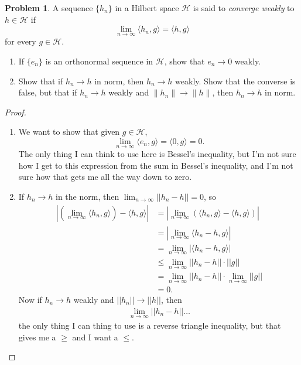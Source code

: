 \documentclass[12pt]{article}
\theoremstyle{definition}
\newtheorem{ex}{Problem}
\begin{document}
\begin{ex}
	A sequence $\lbrace h_n \rbrace$ in a Hilbert space $\mathscr{H}$ is said to \textit{converge weakly} to $h \in \mathscr{H}$ if \begin{equation*}
		\lim_{n \to \infty} \langle h_n, g \rangle = \langle h, g \rangle
	\end{equation*}
	for every $g \in \mathscr{H}$.
	\begin{enumerate}[label=(\alph*)]
		\item If $\lbrace e_n \rbrace$ is an orthonormal sequence in $\mathscr{H}$, show that $e_n \to 0$ weakly.
		\item Show that if $h_n \to h$ in norm, then $h_n \to h$ weakly.
		      Show that the converse is false, but that if $h_n \to h$ weakly and $\|h_n\| \to \|h\|$, then $h_n \to h$ in norm.
	\end{enumerate}
\end{ex}
\begin{proof}\
	\begin{enumerate}[label=(\alph*)]
		\item We want to show that given $g \in \mathscr{H}$, \begin{equation*}
			      \lim_{n\to\infty} \langle e_n, g \rangle = \langle 0, g \rangle = 0.
		      \end{equation*}
		      The only thing I can think to use here is Bessel's inequality, but I'm not sure how I get to this expression from the sum in Bessel's inequality, and I'm not sure how that gets me all the way down to zero.
        \item If $h_n \to h$ in the norm, then $\lim_{n \to\infty} ||h_n - h|| = 0$, so \begin{align*}
            \left|\left(\lim_{n\to\infty} \langle h_n, g \rangle\right) - \langle h, g \rangle\right| & = \left|\lim_{n\to\infty} \left(\langle h_n, g \rangle - \langle h, g \rangle\right)\right| \\
            & = \left|\lim_{n \to \infty} \langle h_n - h, g \rangle\right| \\
            & = \lim_{n \to \infty} \left|\langle h_n - h, g \rangle\right| \\
            & \leq \lim_{n \to \infty} ||h_n - h||\cdot||g|| \\
            & = \lim_{n \to \infty} ||h_n - h||\cdot\lim_{n \to \infty}||g|| \\
            & = 0.
        \end{align*}
        Now if $h_n \to h$ weakly and $||h_n|| \to ||h||$, then \begin{align*}
          \lim_{n \to \infty}||h_n - h||\dots
        \end{align*}
        the only thing I can thing to use is a reverse triangle inequality, but that gives me a $\geq$ and I want a $\leq$.
	\end{enumerate}
\end{proof}
\end{document}
